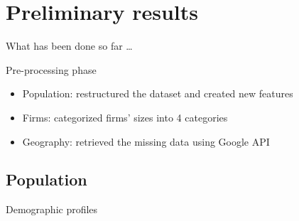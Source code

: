 \documentclass[12pt]{beamer}
\begin{document}
\section{Preliminary results}


\begin{frame}
	\centerline{\Huge\textcolor{bscuro}{What has been done so far \ldots}}		
\end{frame}


\begin{frame}{\textcolor{bscuro}{Pre-processing phase}}
	\begin{itemize}
		\item Population: restructured the dataset and created new features
		\item Firms: categorized firms' sizes into 4 categories
		\item Geography: retrieved the missing data using Google API
	\end{itemize}
\end{frame}


\subsection{Population}


\begin{frame}{\textcolor{bscuro}{Demographic profiles}}
	\begin{figure}[!ht] 
		\centering
	\end{figure}
\end{frame}
\end{document}
